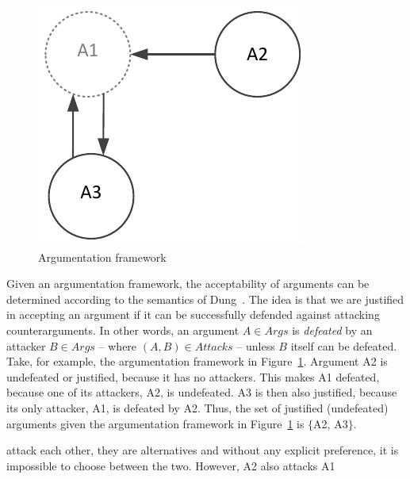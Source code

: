 \documentclass[11.5pt,two column]{llncs}
\begin{document}
\begin{figure}[ht]
\centering
\includegraphics[scale=0.6]{img/Fig1}
\caption{Argumentation framework}
\label{fig:pras:example}
\end{figure}

Given an argumentation framework, the acceptability of arguments can be determined according to the semantics of Dung~\cite{Dung1995}. The idea is that we are justified in accepting an argument if it can be successfully defended against attacking counterarguments. In other words, an argument $A \in Args$ is \emph{defeated} by an attacker $B \in Args$ -- where $(A, B) \in Attacks$ -- unless $B$ itself can be defeated. Take, for example, the argumentation framework in Figure~\ref{fig:pras:example}. Argument A2 is undefeated or justified, because it has no attackers. This makes A1 defeated, because one of its attackers, A2, is undefeated. A3 is then also justified, because its only attacker, A1, is defeated by A2. Thus, the set of justified (undefeated) arguments given the argumentation framework in Figure~\ref{fig:pras:example} is $\{$A2, A3$\}$. 


attack each other, they are alternatives and without any explicit preference, it is impossible to choose between the two. However, A2 also attacks A1 
\end{document}
